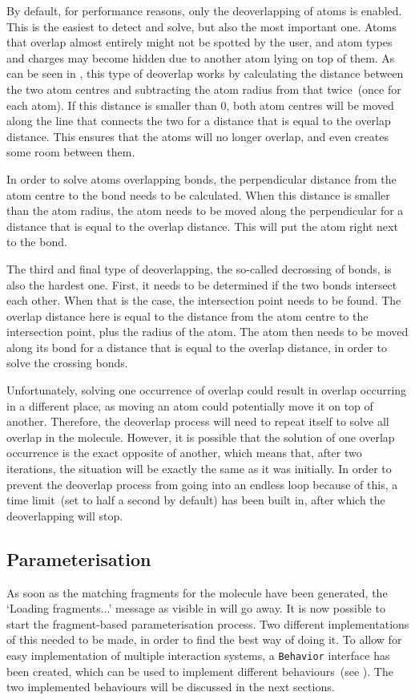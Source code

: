 By default, for performance reasons, only the deoverlapping of atoms is enabled. This is the easiest to detect and solve, but also the most important one. Atoms that overlap almost entirely might not be spotted by the user, and atom types and charges may become hidden due to another atom lying on top of them. As can be seen in , this type of deoverlap works by calculating the distance between the two atom centres and subtracting the atom radius from that twice~(once for each atom). If this distance is smaller than $0$, both atom centres will be moved along the line that connects the two for a distance that is equal to the overlap distance. This ensures that the atoms will no longer overlap, and even creates some room between them.

In order to solve atoms overlapping bonds, the perpendicular distance from the atom centre to the bond needs to be calculated. When this distance is smaller than the atom radius, the atom needs to be moved along the perpendicular for a distance that is equal to the overlap distance. This will put the atom right next to the bond.

The third and final type of deoverlapping, the so-called decrossing of bonds, is also the hardest one. First, it needs to be determined if the two bonds intersect each other. When that is the case, the intersection point needs to be found. The overlap distance here is equal to the distance from the atom centre to the intersection point, plus the radius of the atom. The atom then needs to be moved along its bond for a distance that is equal to the overlap distance, in order to solve the crossing bonds.

Unfortunately, solving one occurrence of overlap could result in overlap occurring in a different place, as moving an atom could potentially move it on top of another. Therefore, the deoverlap process will need to repeat itself to solve all overlap in the molecule. However, it is possible that the solution of one overlap occurrence is the exact opposite of another, which means that, after two iterations, the situation will be exactly the same as it was initially. In order to prevent the deoverlap process from going into an endless loop because of this, a time limit~(set to half a second by default) has been built in, after which the deoverlapping will stop.

\subsection{Parameterisation}
As soon as the matching fragments for the molecule have been generated, the `Loading fragments...' message as visible in  will go away. It is now possible to start the fragment-based parameterisation process. Two different implementations of this needed to be made, in order to find the best way of doing it. To allow for easy implementation of multiple interaction systems, a \verb|Behavior| interface has been created, which can be used to implement different behaviours~(see ). The two implemented behaviours will be discussed in the next sections.

